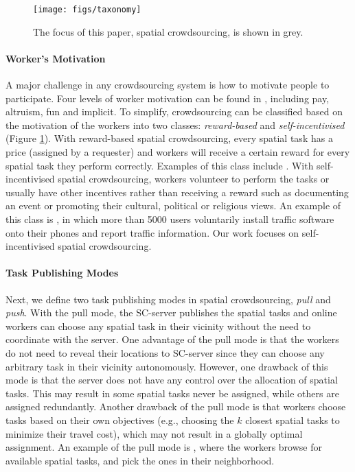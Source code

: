 \documentclass{USC-Thesis}
\numberwithin{equation}{chapter}
\begin{document}
\begin{figure}[!htb]\centering
  \texttt{[image: figs/taxonomy]}
  \caption{The focus of this paper, spatial crowdsourcing, is shown in grey.}
  \label{fig:taxonomy}
\end{figure}

\paragraph{Worker's Motivation} 
A major challenge in any crowdsourcing system is how to motivate people to participate. Four levels of worker motivation can be found in \cite{quinn2011human}, including pay, altruism, fun and implicit. To simplify, crowdsourcing can be classified based on the motivation of the workers into two classes: \textit{reward-based} and \textit{self-incentivised} (Figure \ref{fig:taxonomy}). With reward-based spatial crowdsourcing, every spatial task has a price (assigned by a requester) and workers will receive a certain reward for every spatial task they perform correctly. Examples of this class include \cite{fieldagent,gigwalk}. With self-incentivised spatial crowdsourcing, workers volunteer to perform the tasks or usually have other incentives rather than receiving a reward such as documenting an event or promoting their cultural, political or religious views. An example of this class is \cite{trafficucb}, in which more than 5000 users voluntarily install traffic software onto their phones and report traffic information. Our work focuses on self-incentivised spatial crowdsourcing.

\paragraph{Task Publishing Modes}
Next, we define two task publishing modes in spatial crowdsourcing, \emph{pull} and \emph{push}. With the pull mode, the SC-server publishes the spatial tasks and online workers can choose any spatial task in their vicinity without the need to coordinate with the server. One advantage of the pull mode is that the workers do not need to reveal their locations to SC-server since they can choose any arbitrary task in their vicinity autonomously. However, one drawback of this mode is that the server does not have any control over the allocation of spatial tasks. This may result in some spatial tasks never be assigned, while others are assigned redundantly. Another drawback of the pull mode is that workers choose tasks based on their own objectives (e.g., choosing the $k$ closest spatial tasks to minimize their travel cost), which may not result in a globally optimal assignment. An example of the pull mode is \cite{alt2010location}, where the workers browse for available spatial tasks, and pick the ones in their neighborhood.
\end{document}
